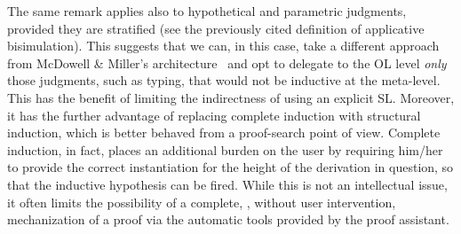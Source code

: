 \documentclass[final]{svjour3}
\begin{document}
The same remark applies also to hypothetical and parametric judgments, provided
they are stratified (see the previously cited definition of
applicative bisimulation).  This suggests that we can, in this case,
take a different approach from McDowell \& Miller's
architecture~\cite{McDowell01} and
opt to delegate to the OL level \emph{only} those judgments, such as
typing, that would not be inductive at the meta-level. This has the
benefit of limiting the indirectness of using an explicit SL\@.
Moreover, it has the further advantage of replacing complete induction
with structural induction, which is better behaved from a proof-search
point of view.  Complete induction, in fact, places an additional
burden on the user by requiring him/her to provide the correct
instantiation for the height of the derivation in question, so that
the inductive hypothesis can be fired. While this is not an
intellectual issue, it often limits the possibility of a complete, \ie,
without user intervention, mechanization of a proof via the automatic
tools provided by the proof assistant.
\end{document}
